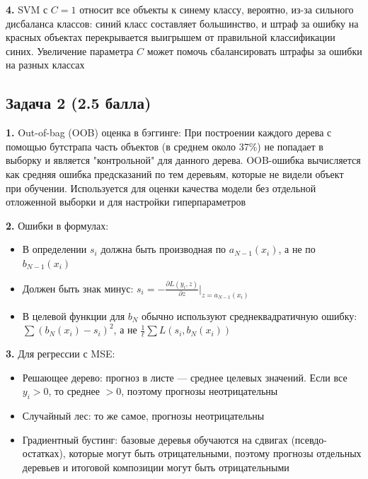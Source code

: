 \documentclass[a4paper,12pt]{article}
\begin{document}
\bigskip

\textbf{4.} SVM с \(C = 1\) относит все объекты к синему классу, вероятно, из-за сильного дисбаланса классов: синий класс составляет большинство, и штраф за ошибку на красных объектах перекрывается выигрышем от правильной классификации синих. Увеличение параметра \(C\) может помочь сбалансировать штрафы за ошибки на разных классах

\newpage

\subsection*{Задача 2 (2.5 балла)}

\textbf{1.} Out-of-bag (OOB) оценка в бэггинге:
При построении каждого дерева с помощью бутстрапа часть объектов (в среднем около 37\%) не попадает в выборку и является "контрольной" для данного дерева.
OOB-ошибка вычисляется как средняя ошибка предсказаний по тем деревьям, которые не видели объект при обучении.
Используется для оценки качества модели без отдельной отложенной выборки и для настройки гиперпараметров

\bigskip

\textbf{2.} Ошибки в формулах:
\begin{itemize}
  \item В определении \(s_i\) должна быть производная по \(a_{N-1}(x_i)\), а не по \(b_{N-1}(x_i)\)
  \item Должен быть знак минус: \(s_i = -\frac{\partial L(y_i, z)}{\partial z}\big|_{z = a_{N-1}(x_i)}\)
  \item В целевой функции для \(b_N\) обычно используют среднеквадратичную ошибку: \(\sum (b_N(x_i) - s_i)^2\), а не \(\frac1\ell \sum L(s_i, b_N(x_i))\)
\end{itemize}

\bigskip

\textbf{3.} Для регрессии с MSE:
\begin{itemize}
  \item Решающее дерево: прогноз в листе — среднее целевых значений. Если все \(y_i > 0\), то среднее \(> 0\), поэтому прогнозы неотрицательны
  \item Случайный лес: то же самое, прогнозы неотрицательны
  \item Градиентный бустинг: базовые деревья обучаются на сдвигах (псевдо-остатках), которые могут быть отрицательными, поэтому прогнозы отдельных деревьев и итоговой композиции могут быть отрицательными
\end{itemize}
\end{document}
